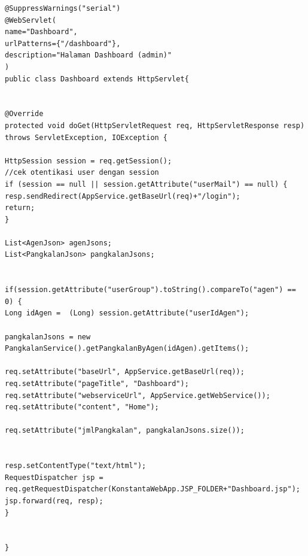 \begin{lstlisting}[caption=Potongan kode \textit{controller} aplikasi berbasis web, label=controllerWeb]
@SuppressWarnings("serial")
@WebServlet(
name="Dashboard",
urlPatterns={"/dashboard"}, 
description="Halaman Dashboard (admin)"
)
public class Dashboard extends HttpServlet{


@Override
protected void doGet(HttpServletRequest req, HttpServletResponse resp) 
throws ServletException, IOException {

HttpSession session = req.getSession();
//cek otentikasi user dengan session
if (session == null || session.getAttribute("userMail") == null) {
resp.sendRedirect(AppService.getBaseUrl(req)+"/login");
return;
}

List<AgenJson> agenJsons;
List<PangkalanJson> pangkalanJsons;


if(session.getAttribute("userGroup").toString().compareTo("agen") == 0) {
Long idAgen =  (Long) session.getAttribute("userIdAgen");

pangkalanJsons = new PangkalanService().getPangkalanByAgen(idAgen).getItems();

req.setAttribute("baseUrl", AppService.getBaseUrl(req));
req.setAttribute("pageTitle", "Dashboard");
req.setAttribute("webserviceUrl", AppService.getWebService());
req.setAttribute("content", "Home");

req.setAttribute("jmlPangkalan", pangkalanJsons.size());


resp.setContentType("text/html");
RequestDispatcher jsp = req.getRequestDispatcher(KonstantaWebApp.JSP_FOLDER+"Dashboard.jsp");
jsp.forward(req, resp);
}


}

\end{lstlisting}


